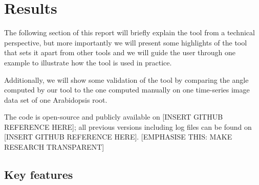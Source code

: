 
\chapter{Results} %

\label{results} %

%





The following section of this report will briefly explain the tool from a technical perspective, but more importantly  %
we will present some highlights of the tool that sets it apart from other tools and we will guide the user through one example to illustrate how the tool is used in practice.

Additionally, we will show some validation of the tool by comparing the angle computed by our tool to the one computed manually on one time-series image data set of one Arabidopsis root. 

The code is open-source and publicly available on [INSERT GITHUB REFERENCE HERE]; all previous versions including log files can be found on [INSERT GITHUB REFERENCE HERE].
[EMPHASISE THIS: MAKE RESEARCH TRANSPARENT]


\section{Key features} %

